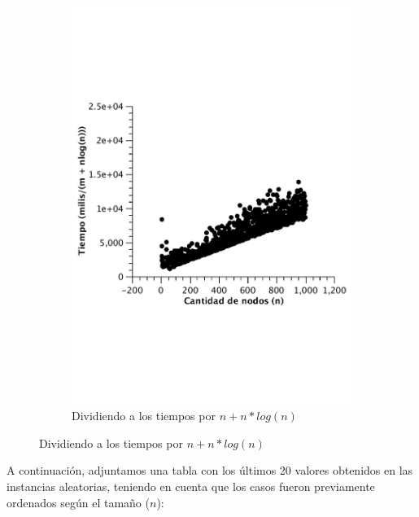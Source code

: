 \begin{figure}[H]
        \begin{subfigure}[b]{0.5\textwidth}
                \includegraphics[width=\textwidth]{imagenes/completo-matriz-4.pdf}
                \caption{Dividiendo a los tiempos por $n + n*log(n)$}
        \end{subfigure}

\end{figure}

A continuación, adjuntamos una tabla con los últimos 20 valores obtenidos en las instancias aleatorias, teniendo en cuenta que los casos fueron previamente ordenados según el tamaño ($n$):

